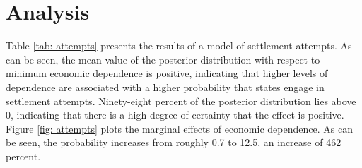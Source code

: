 \documentclass[../../dissertation.tex]{subfiles}
\begin{document}
\section{Analysis}

Table \ref{tab: attempts} presents the results of a model of settlement attempts. As can be seen, the mean value of the posterior distribution with respect to minimum economic dependence is positive, indicating that higher levels of dependence are associated with a higher probability that states engage in settlement attempts. Ninety-eight percent of the posterior distribution lies above 0, indicating that there is a high degree of certainty that the effect is positive.  Figure \ref{fig: attempts} plots the marginal effects of economic dependence. As can be seen, the probability increases from roughly 0.7 to 12.5, an increase of 462 percent.
\end{document}

